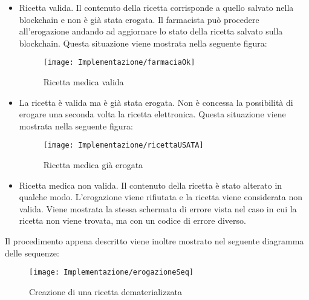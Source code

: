 \begin{enumerate}
\begin{itemize}
	      	\item Ricetta valida. Il contenuto della ricetta corrisponde a quello salvato nella blockchain e non è già stata erogata. Il farmacista può procedere all'erogazione andando ad aggiornare lo stato della ricetta salvato sulla blockchain. Questa situazione viene mostrata nella seguente figura: 
	      	      \begin{figure}[H]
	      	      	\centering
	      	      	\texttt{[image: Implementazione/farmaciaOk]}
	      	      	\caption{Ricetta medica valida}
	      	      	\label{fig:ricetta medica valida}
	      	      \end{figure}
	      	\item La ricetta è valida ma è già stata erogata. Non è concessa la possibilità di erogare una seconda volta la ricetta elettronica. Questa situazione viene mostrata nella seguente figura: 
	      	      \begin{figure}[H]
	      	      	\centering
	      	      	\texttt{[image: Implementazione/ricettaUSATA]}
	      	      	\caption{Ricetta medica già erogata}
	      	      	\label{fig:ricetta medica già erogata}
	      	      \end{figure}
	      	\item Ricetta medica non valida. Il contenuto della ricetta è stato alterato in qualche modo. L'erogazione viene rifiutata e la ricetta viene considerata non valida. Viene mostrata la stessa schermata di errore vista nel caso in cui la ricetta non viene trovata, ma con un codice di errore diverso.
	      \end{itemize}
\end{enumerate}
Il procedimento appena descritto viene inoltre mostrato nel seguente diagramma delle sequenze:
%
\begin{figure}[H]
	\centering
	\texttt{[image: Implementazione/erogazioneSeq]}
	\caption{Creazione di una ricetta dematerializzata}
	\label{fig:creazione di una ricetta dematerializzata}
\end{figure}
%  	 
